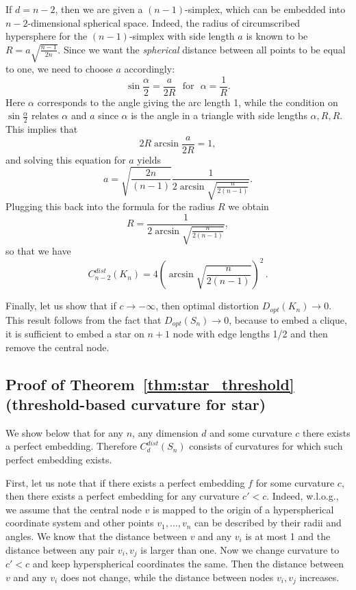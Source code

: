 \documentclass{article} %
\begin{document}
If $d = n-2$, then we are given a $(n-1)$-simplex, which can be embedded into $n-2$-dimensional spherical space. Indeed, the radius of circumscribed hypersphere for the $(n-1)$-simplex with side length $a$ is known to be $R = a\sqrt{\frac{n-1}{2n}}$. Since we want the \textit{spherical} distance between all points to be equal to one, we need to choose $a$ accordingly:
\[
\sin \frac{\alpha}{2} = \frac{a}{2R} \,\,\text{ for } \,\,\alpha = \frac{1}{R}.
\]
Here $\alpha$ corresponds to the angle giving the arc length 1, while the condition on $\sin \frac{\alpha}{2}$ relates $\alpha$ and $a$ since $\alpha$ is the angle in a triangle with side lengths $\alpha, R, R$.
This implies that
\[
2 R \arcsin \frac{a}{2R} = 1,
\]
and solving this equation for $a$ yields
\[
a  = \sqrt{\frac{2n}{(n-1)}}\frac{1}{2\arcsin \sqrt{\frac{n}{2(n-1)}}}.
\]
Plugging this back into the formula for the radius $R$ we obtain
\[
R = \frac{1}{2\arcsin \sqrt{\frac{n}{2(n-1)}}},
\]
so that we have
\[
C_{n-2}^{dist}(K_n) = 4 \left(\arcsin \sqrt{\frac{n}{2(n-1)}}\right)^2\,.
\]

Finally, let us show that if $c \to -\infty$, then optimal distortion $D_{opt}(K_n) \to 0$. This result follows from the fact that $D_{opt}(S_n) \to 0$, because to embed a clique, it is sufficient to embed a star on $n+1$ node with edge lengths 1/2 and then remove the central node. 

\subsection{Proof of Theorem~\ref{thm:star_threshold} (threshold-based curvature for star)}\label{app:star_threshold}

We show below that for any $n$, any dimension $d$ and some curvature $c$ there exists a perfect embedding.
Therefore $C_d^{dist}(S_n)$ consists of curvatures for which such perfect embedding exists. 

First, let us note that if there exists a perfect embedding $f$ for some curvature $c$, then there exists a perfect embedding for any curvature $c' < c$. Indeed, w.l.o.g., we assume that the central node $v$ is mapped to the origin of a hyperspherical coordinate system and other points $v_1, \ldots, v_n$ can be described by their radii and angles. We know that the distance between $v$ and any $v_i$ is at most 1 and the distance between any pair $v_i, v_j$ is larger than one. Now we change curvature to $c' < c$ and keep hyperspherical coordinates the same. Then the distance between $v$ and any $v_i$ does not change, while the distance between nodes $v_i, v_j$ increases.
\end{document}
